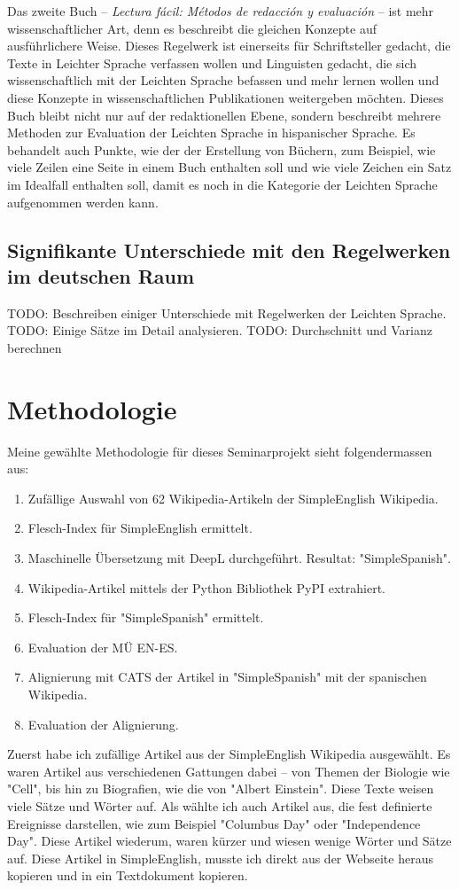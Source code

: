 \documentclass[11pt]{article}
\begin{document}
Das zweite Buch -- \textit{Lectura fácil: Métodos de redacción y evaluación} \cite{garcia2014lectura} -- ist mehr wissenschaftlicher Art, denn es beschreibt die gleichen Konzepte auf ausführlichere Weise. Dieses Regelwerk ist einerseits für Schriftsteller gedacht, die Texte in Leichter Sprache verfassen wollen und Linguisten gedacht, die sich wissenschaftlich mit der Leichten Sprache befassen und mehr lernen wollen und diese Konzepte in wissenschaftlichen Publikationen weitergeben möchten. Dieses Buch bleibt nicht nur auf der redaktionellen Ebene, sondern beschreibt mehrere Methoden zur Evaluation der Leichten Sprache in hispanischer Sprache. Es behandelt auch Punkte, wie der der Erstellung von Büchern, zum Beispiel, wie viele Zeilen eine Seite in einem Buch enthalten soll und wie viele Zeichen ein Satz im Idealfall enthalten soll, damit es noch in die Kategorie der Leichten Sprache aufgenommen werden kann.

\subsection{Signifikante Unterschiede mit den Regelwerken im deutschen Raum}
TODO: Beschreiben einiger Unterschiede mit Regelwerken der Leichten Sprache.
TODO: Einige Sätze im Detail analysieren.
TODO: Durchschnitt und Varianz berechnen

\section{Methodologie}
Meine gewählte Methodologie für dieses Seminarprojekt sieht folgendermassen aus:
\begin{enumerate}
\item Zufällige Auswahl von 62 Wikipedia-Artikeln der SimpleEnglish Wikipedia. 
\item Flesch-Index für SimpleEnglish ermittelt.
\item Maschinelle Übersetzung mit DeepL durchgeführt. Resultat:  "SimpleSpanish".
\item Wikipedia-Artikel mittels der Python Bibliothek PyPI extrahiert.
\item Flesch-Index für "SimpleSpanish" ermittelt.
\item Evaluation der MÜ EN-ES.
\item Alignierung mit CATS der Artikel in "SimpleSpanish" mit der spanischen Wikipedia.
\item Evaluation der Alignierung.
\end{enumerate}
Zuerst habe ich zufällige Artikel aus der SimpleEnglish Wikipedia ausgewählt. Es waren Artikel aus verschiedenen Gattungen dabei -- von Themen der Biologie wie "Cell", bis hin zu Biografien, wie die von "Albert Einstein". Diese Texte weisen viele Sätze und Wörter auf. Als wählte ich auch Artikel aus, die fest definierte Ereignisse darstellen, wie zum Beispiel "Columbus Day" oder "Independence Day". Diese Artikel wiederum, waren kürzer und wiesen wenige Wörter und Sätze auf. Diese Artikel in SimpleEnglish, musste ich direkt aus der Webseite heraus kopieren und in ein Textdokument kopieren.
\end{document}
